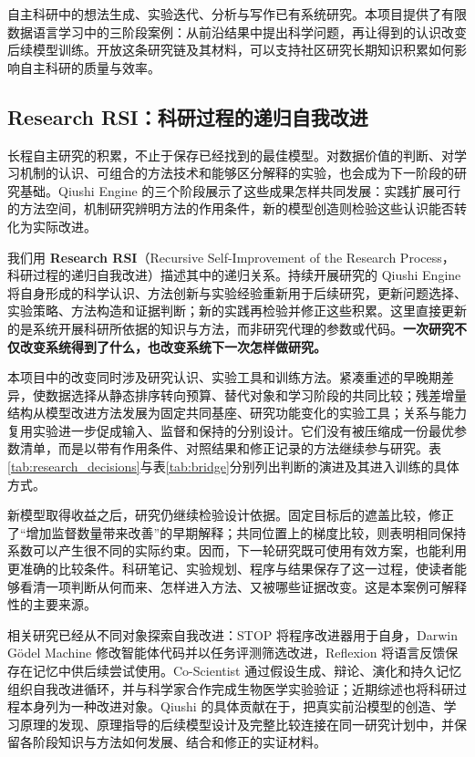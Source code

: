 自主科研中的想法生成、实验迭代、分析与写作已有系统研究\citep{lu2026automation}。本项目提供了有限数据语言学习中的三阶段案例：从前沿结果中提出科学问题，再让得到的认识改变后续模型训练。开放这条研究链及其材料，可以支持社区研究长期知识积累如何影响自主科研的质量与效率。

\subsection{Research RSI：科研过程的递归自我改进}
\label{sec:rsi}

长程自主研究的积累，不止于保存已经找到的最佳模型。对数据价值的判断、对学习机制的认识、可组合的方法技术和能够区分解释的实验，也会成为下一阶段的研究基础。Qiushi Engine 的三个阶段展示了这些成果怎样共同发展：实践扩展可行的方法空间，机制研究辨明方法的作用条件，新的模型创造则检验这些认识能否转化为实际改进。

我们用 \textbf{Research RSI}（Recursive Self-Improvement of the Research Process，科研过程的递归自我改进）描述其中的递归关系。持续开展研究的 Qiushi Engine 将自身形成的科学认识、方法创新与实验经验重新用于后续研究，更新问题选择、实验策略、方法构造和证据判断；新的实践再检验并修正这些积累。这里直接更新的是系统开展科研所依据的知识与方法，而非研究代理的参数或代码。\textbf{一次研究不仅改变系统得到了什么，也改变系统下一次怎样做研究。}

本项目中的改变同时涉及研究认识、实验工具和训练方法。紧凑重述的早晚期差异，使数据选择从静态排序转向预算、替代对象和学习阶段的共同比较；残差增量结构从模型改进方法发展为固定共同基座、研究功能变化的实验工具；关系与能力复用实验进一步促成输入、监督和保持的分别设计。它们没有被压缩成一份最优参数清单，而是以带有作用条件、对照结果和修正记录的方法继续参与研究。表\ref{tab:research_decisions}与表\ref{tab:bridge}分别列出判断的演进及其进入训练的具体方式。

新模型取得收益之后，研究仍继续检验设计依据。固定目标后的遮盖比较，修正了“增加监督数量带来改善”的早期解释；共同位置上的梯度比较，则表明相同保持系数可以产生很不同的实际约束。因而，下一轮研究既可使用有效方案，也能利用更准确的比较条件。科研笔记、实验规划、程序与结果保存了这一过程，使读者能够看清一项判断从何而来、怎样进入方法、又被哪些证据改变。这是本案例可解释性的主要来源。

相关研究已经从不同对象探索自我改进：STOP 将程序改进器用于自身\citep{zelikman2024stop}，Darwin G\"odel Machine 修改智能体代码并以任务评测筛选改进\citep{zhang2026dgm}，Reflexion 将语言反馈保存在记忆中供后续尝试使用\citep{shinn2023reflexion}。Co-Scientist 通过假设生成、辩论、演化和持久记忆组织自我改进循环，并与科学家合作完成生物医学实验验证\citep{gottweis2026coscientist}；近期综述也将科研过程本身列为一种改进对象\citep{chen2026recursive}。Qiushi 的具体贡献在于，把真实前沿模型的创造、学习原理的发现、原理指导的后续模型设计及完整比较连接在同一研究计划中，并保留各阶段知识与方法如何发展、结合和修正的实证材料。

